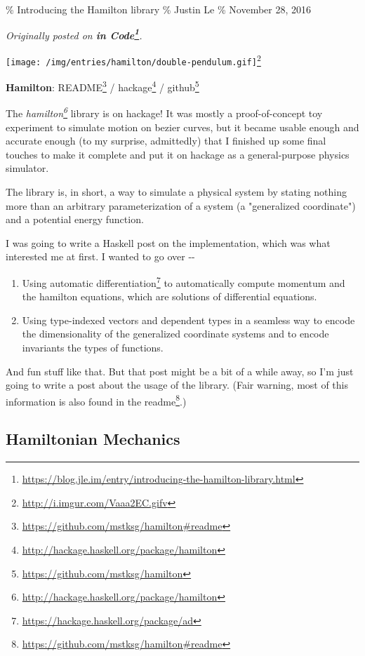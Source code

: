 \documentclass[]{article}
\renewcommand{\href}[2]{#2\footnote{\url{#1}}}
\begin{document}
\% Introducing the Hamilton library \% Justin Le \% November 28, 2016

\emph{Originally posted on
\textbf{\href{https://blog.jle.im/entry/introducing-the-hamilton-library.html}{in
Code}}.}

\href{http://i.imgur.com/Vaaa2EC.gifv}{\texttt{[image: /img/entries/hamilton/double-pendulum.gif]}}

\textbf{Hamilton}: \href{https://github.com/mstksg/hamilton\#readme}{README} /
\href{http://hackage.haskell.org/package/hamilton}{hackage} /
\href{https://github.com/mstksg/hamilton}{github}

The \emph{\href{http://hackage.haskell.org/package/hamilton}{hamilton}} library
is on hackage! It was mostly a proof-of-concept toy experiment to simulate
motion on bezier curves, but it became usable enough and accurate enough (to my
surprise, admittedly) that I finished up some final touches to make it complete
and put it on hackage as a general-purpose physics simulator.

The library is, in short, a way to simulate a physical system by stating nothing
more than an arbitrary parameterization of a system (a "generalized coordinate")
and a potential energy function.

I was going to write a Haskell post on the implementation, which was what
interested me at first. I wanted to go over -\/-

\begin{enumerate}
\item
  Using \href{https://hackage.haskell.org/package/ad}{automatic differentiation}
  to automatically compute momentum and the hamilton equations, which are
  solutions of differential equations.
\item
  Using type-indexed vectors and dependent types in a seamless way to encode the
  dimensionality of the generalized coordinate systems and to encode invariants
  the types of functions.
\end{enumerate}

And fun stuff like that. But that post might be a bit of a while away, so I'm
just going to write a post about the usage of the library. (Fair warning, most
of this information is also found in the
\href{https://github.com/mstksg/hamilton\#readme}{readme}.)

\subsection{Hamiltonian Mechanics}
\end{document}
